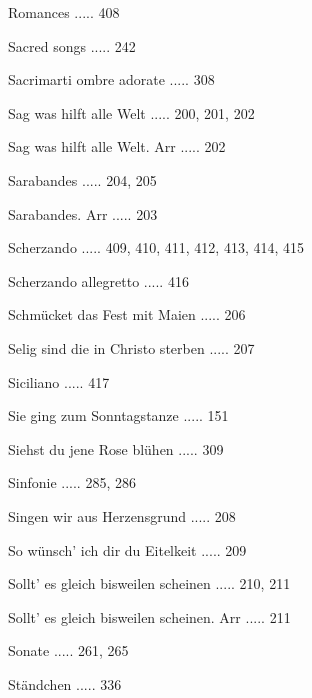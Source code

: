 \documentclass[twocolumn]{book}
\begin{document}
\newline 
Romances ..... 408

\newline 
Sacred songs ..... 242

\newline 
Sacrimarti ombre adorate ..... 308

\newline 
Sag was hilft alle Welt ..... 200, 201, 202

\newline 
Sag was hilft alle Welt. Arr ..... 202

\newline 
Sarabandes ..... 204, 205

\newline 
Sarabandes. Arr ..... 203

\newline 
Scherzando ..... 409, 410, 411, 412, 413, 414, 415

\newline 
Scherzando allegretto ..... 416

\newline 
Schmücket das Fest mit Maien ..... 206

\newline 
Selig sind die in Christo sterben ..... 207

\newline 
Siciliano ..... 417

\newline 
Sie ging zum Sonntagstanze ..... 151

\newline 
Siehst du jene Rose blühen ..... 309

\newline 
Sinfonie ..... 285, 286

\newline 
Singen wir aus Herzensgrund ..... 208

\newline 
So wünsch' ich dir du Eitelkeit ..... 209

\newline 
Sollt' es gleich bisweilen scheinen ..... 210, 211

\newline 
Sollt' es gleich bisweilen scheinen. Arr ..... 211

\newline 
Sonate ..... 261, 265

\newline 
Ständchen ..... 336
\end{document}
